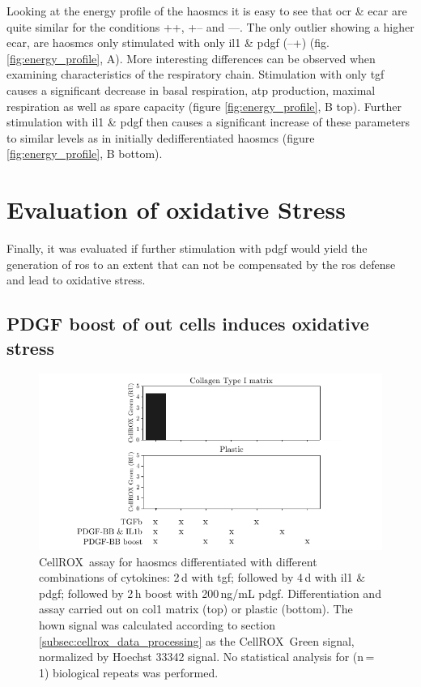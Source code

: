     Looking at the energy profile of the \acp{haosmc} it is easy to see that \ac{ocr} \& \ac{ecar} are quite similar for the conditions ++, +– and ––. The only outlier showing a higher \ac{ecar}, are \acp{haosmc} only stimulated with only \ac{il1} \& \ac{pdgf} (–+) (fig. \ref{fig:energy_profile}, A). More interesting differences can be observed when examining characteristics of the respiratory chain. Stimulation with only \ac{tgf} causes a significant decrease in basal respiration, \ac{atp} production, maximal respiration as well as spare capacity (figure \ref{fig:energy_profile}, B top). Further stimulation with \ac{il1} \& \ac{pdgf} then causes a significant increase of these parameters to similar levels as in initially dedifferentiated \acp{haosmc} (figure \ref{fig:energy_profile}, B bottom).

\section{Evaluation of oxidative Stress}
\label{sec:oxStress}
Finally, it was evaluated if further stimulation with \ac{pdgf} would yield the generation of \ac{ros} to an extent that can not be compensated by the \ac{ros} defense and lead to oxidative stress.

    \subsection{PDGF boost of out cells induces oxidative stress}

    \begin{figure}[h!]
    \capstart
        \centering
    	\includegraphics{Abbildung/CellROX_initial_cond.pdf}

    	\begin{minipage}{\captionwidth}
    		\caption[repeat_Lisa]{ \newline CellROX\texttrademark~assay for \acp{haosmc} differentiated with different combinations of cytokines: 2\,d with \ac{tgf}; followed by 4\,d with \ac{il1} \& \ac{pdgf}; followed by 2\,h boost with 200\,ng/mL \ac{pdgf}. Differentiation and assay carried out on \ac{col1} matrix (top) or plastic (bottom). The hown signal was calculated according to section \ref{subsec:cellrox_data_processing} as the CellROX\texttrademark~Green signal, normalized by Hoechst 33342 signal. No statistical analysis for (n\,=\,1) biological repeats was performed. }
    		\label{fig:cellrox_8con}
    	\end{minipage}
    \end{figure}


